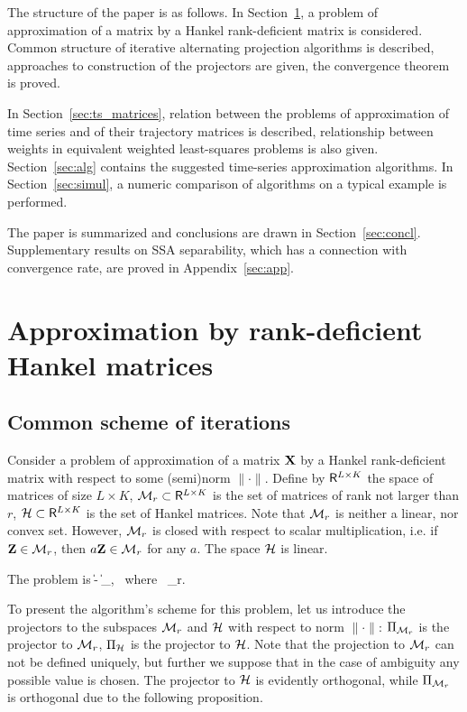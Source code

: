 \documentclass[sii]{ipart}
\begin{document}
The structure of the paper is as follows.  In Section~\ref{sec:lowrank_appr}, a problem of approximation of a matrix by a Hankel rank-deficient matrix is considered. Common structure of iterative alternating projection algorithms is described, approaches to construction of the projectors are given, the convergence theorem is proved.

In Section~\ref{sec:ts_matrices}, relation between the problems of approximation of time series and of their trajectory matrices is described, relationship between weights in equivalent weighted least-squares problems is also given. Section~\ref{sec:alg} contains the suggested time-series approximation algorithms. In Section~\ref{sec:simul}, a numeric comparison of algorithms on a typical example is performed.

The paper is summarized and conclusions are drawn in Section~\ref{sec:concl}. Supplementary results on SSA separability, which has a connection with convergence rate, are proved in Appendix~\ref{sec:app}.

\section{Approximation by rank-deficient Hankel matrices}
\label{sec:lowrank_appr}
\subsection{Common scheme of iterations}
Consider a problem of approximation of a matrix $\mathbf{X}$ by a Hankel rank-deficient matrix with respect to some (semi)norm $\|\cdot\|$. Define by $\mathsf{R}^{L\times K}$ the space of matrices of size $L \times K$, $\mathcal{M}_r\subset \mathsf{R}^{L\times K}$ is the set of matrices of rank not larger than $r$,
$\mathcal{H} \subset \mathsf{R}^{L\times K}$ is the set of Hankel matrices.
Note that  $\mathcal{M}_r$ is neither a linear, nor convex set. However, $\mathcal{M}_r$ is closed with respect to scalar multiplication, i.e.
if $\mathbf{Z}\in \mathcal{M}_r$, then $a\mathbf{Z}\in \mathcal{M}_r$ for any $a$.
The space $\mathcal{H}$ is linear.

The problem is
\be
\label{eq:gen_task}
\|\bfX - \bfY\| \to \min_\bfY, \mbox{\ where\ } \bfY \in \calH \cap \calM_r.
\ee

To present the algorithm's scheme for this problem, let us introduce the projectors to the subspaces $\mathcal{M}_r$ and $\mathcal{H}$ with respect to norm $\|\cdot\|$: $\Pi_{\mathcal{M}_r}$ is the projector to $\mathcal{M}_r$,
$\Pi_{\mathcal{H}}$ is the projector to $\mathcal{H}$.
Note that the projection to $\mathcal{M}_r$ can not be defined uniquely, but further we suppose that in the case of ambiguity any possible value is chosen. The projector to $\mathcal{H}$ is evidently orthogonal, while $\Pi_{\mathcal{M}_r}$ is orthogonal due to the following proposition.
\end{document}

